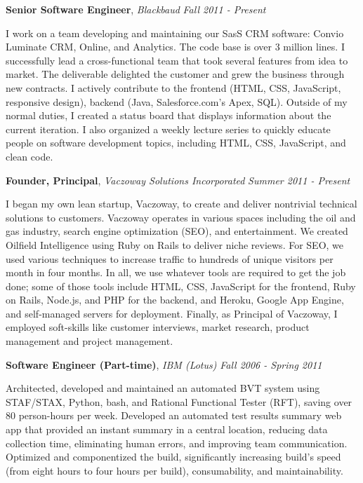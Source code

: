 \documentclass[9pt]{article}
\newenvironment{changemargin}[2]{%
  \begin{list}{}{%
    \setlength{\topsep}{0pt}%
    \setlength{\leftmargin}{#1}%
    \setlength{\rightmargin}{#2}%
    \setlength{\listparindent}{\parindent}%
    \setlength{\itemindent}{\parindent}%
    \setlength{\parsep}{\parskip}%
  }%
  \item[]}{\end{list}
}
\newcommand{\jobtitle}[3]{
	\textbf{#1}, \emph{#2} \hfill \emph{#3}\\
}
\newcommand{\jobdescription}[1]{
	\begin{changemargin}{0.15in}{0.15in}
    \smallskip
		{#1}
    \medskip
	\end{changemargin}
}
\newenvironment{body} {
	\vspace*{-16pt}
	\begin{changemargin}{-0.25in}{-0.5in}
  }	
	{\end{changemargin}
}
\begin{document}
\begin{body}
	\vspace{14pt}

  \jobtitle{Senior Software Engineer}{Blackbaud}{Fall 2011 - Present}
  \jobdescription{
    I work on a team developing and maintaining our SasS CRM software: Convio Luminate CRM, Online, and Analytics. The code base is over 3 million lines. I successfully lead a cross-functional team that took several features from idea to market. The deliverable delighted the customer and grew the business through new contracts. I actively contribute to the frontend (HTML, CSS, JavaScript, responsive design), backend (Java, Salesforce.com's Apex, SQL). Outside of my normal duties, I created a status board that displays information about the current iteration. I also organized a weekly lecture series to quickly educate people on software development topics, including HTML, CSS, JavaScript, and clean code.
  }

	\jobtitle{Founder, Principal}{Vaczoway Solutions Incorporated}{Summer 2011 - Present}
  \jobdescription{
    I began my own lean startup, Vaczoway, to create and deliver nontrivial technical solutions to customers. Vaczoway operates in various spaces including the oil and gas industry, search engine optimization (SEO), and entertainment. We created Oilfield Intelligence using Ruby on Rails to deliver niche reviews. For SEO, we used various techniques to increase traffic to hundreds of unique visitors per month in four months. In all, we use whatever tools are required to get the job done; some of those tools include HTML, CSS, JavaScript for the frontend, Ruby on Rails, Node.js, and PHP for the backend, and Heroku, Google App Engine, and self-managed servers for deployment. Finally, as Principal of Vaczoway, I  employed soft-skills like customer interviews, market research, product management and project management.
  }

	\jobtitle{Software Engineer (Part-time)}{IBM (Lotus)}{Fall 2006 - Spring 2011}
  \jobdescription{
    Architected, developed and maintained an automated BVT system using STAF/STAX, Python, bash, and Rational Functional Tester (RFT), saving over 80 person-hours per week. Developed an automated test results summary web app that provided an instant summary in a central location, reducing data collection time, eliminating human errors, and improving team communication. Optimized and componentized the build, significantly increasing build’s speed (from eight hours to four hours per build), consumability, and maintainability.
  }


\end{body}
\end{document}
